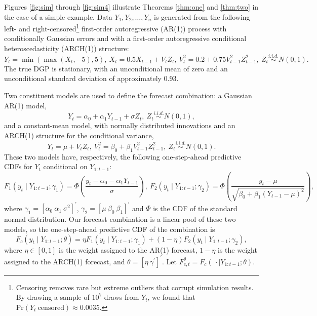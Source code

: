 \documentclass[12pt]{article}
\theoremstyle{definition}
\theoremstyle{remark}
\begin{document}
Figures \ref{fig:sim} through \ref{fig:sim4} illustrate Theorems \ref{thm:one} and \ref{thm:two} in the case of a simple example. Data $Y_1, Y_2, \ldots, Y_n$ is generated from the following left- and right-censored\footnote{Censoring removes rare but extreme outliers that corrupt simulation results. By drawing a sample of $10^7$ draws from $Y_t$, we found that $\mathrm{Pr}(Y_t\ \mathrm{censored}) \approx 0.0035$.} first-order autoregressive (AR(1)) process with conditionally Gaussian errors and with a first-order autoregressive conditional heteroscedasticity (ARCH(1)) structure: 
\begin{equation*}
Y_t = \min(\max(X_t,-5),5),\ X_t = 0.5 X_{t-1} + V_t Z_t,\ V_t^2 = 0.2 + 0.75 V_{t-1}^2 Z_{t-1}^2,\ Z_t \overset{i.i.d.}{\sim} N(0,1).
\end{equation*}
The true DGP is stationary, with an unconditional mean of zero and an unconditional standard deviation of approximately 0.93.

Two constituent models are used to define the forecast combination: a Gaussian AR(1) model, 
\begin{equation}
Y_t = \alpha_0 + \alpha_1 Y_{t-1} + \sigma Z_t,\ Z_t \overset{i.i.d.}{\sim} N(0, 1), \label{eqn:fmod1}
\end{equation}
and a constant-mean model, with normally distributed innovations and an ARCH(1) structure for the conditional variance, 
\begin{equation}
Y_t = \mu + V_t Z_t,\ V^2_t = \beta_0 + \beta_1 V^2_{t-1} Z^2_{t-1},\ Z_t \overset{i.i.d.}{\sim} N(0, 1). \label{eqn:fmod2}
\end{equation}
These two models have, respectively, the following one-step-ahead predictive CDFs for $Y_t$ conditional on $Y_{1:t-1}$: 
\begin{equation*}
\textstyle
F_1(y_t \mid Y_{1:t-1} ; \gamma_1) = \Phi \left( \frac{y_t - \alpha_0 - \alpha_1 Y_{t-1}}{\sigma} \right),\ F_2(y_t \mid Y_{1:t-1} ; \gamma_2) = \Phi \left( \frac{y_t - \mu}{\sqrt{\beta_0 + \beta_1 (Y_{t-1} - \mu)^2}} \right),
\end{equation*}
where $\gamma_1 = [ \alpha_0\ \alpha_1\ \sigma^2 ]^{\prime}$, $\gamma_2 = [ \mu\ \beta_0\ \beta_1 ]^{\prime}$ and $\Phi$ is the CDF of the standard normal distribution. Our forecast combination is a linear pool of these two models, so the one-step-ahead predictive CDF of the combination is 
\begin{equation}
F_c(y_t \mid Y_{1:t-1} ; \theta) = \eta F_1(y_t \mid Y_{1:t-1} ; \gamma_1) + (1 - \eta) F_2(y_t \mid Y_{1:t-1} ; \gamma_2),  \label{eqn:predcdfsim}
\end{equation}
where $\eta \in [0,1]$ is the weight assigned to the AR(1) forecast, $1-\eta$
is the weight assigned to the ARCH(1) forecast, and $\theta = [\eta\ \gamma^{\prime}]^{\prime}$. Let $F^{\theta}_{c,t} = F_c(\, \cdot \mid Y_{1:t-1} ; \theta)$.
\end{document}
